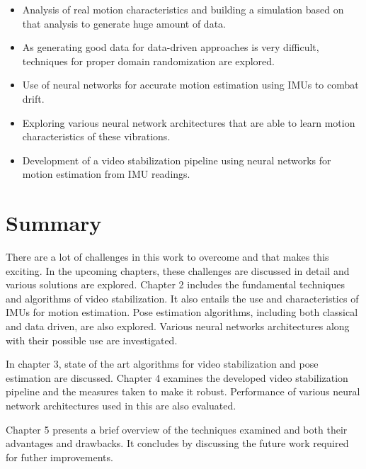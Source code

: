 \begin{itemize}
    \item Analysis of real motion characteristics and building a simulation based on that analysis to generate huge amount of data.

    \item As generating good data for data-driven approaches is very difficult, techniques for proper domain randomization are explored.

    \item Use of neural networks for accurate motion estimation using IMUs to combat drift.

    \item Exploring various neural network architectures that are able to learn motion characteristics of these vibrations.

    \item Development of a video stabilization pipeline using neural networks for motion estimation from IMU readings.
\end{itemize}


\section{Summary}
There are a lot of challenges in this work to overcome and that makes this exciting. In the upcoming chapters, these challenges are discussed in detail and various solutions are explored. Chapter 2 includes the fundamental techniques and algorithms of video stabilization. It also entails the use and characteristics of IMUs for motion estimation. Pose estimation algorithms, including both classical and data driven, are also explored. Various neural networks architectures along with their possible use are investigated.

In chapter 3, state of the art algorithms for video stabilization and pose estimation are discussed. Chapter 4 examines the developed video stabilization pipeline and the measures taken to make it robust. Performance of various neural network architectures used in this are also evaluated.

Chapter 5 presents a brief overview of the techniques examined and both their advantages and drawbacks. It concludes by discussing the future work required for futher improvements.